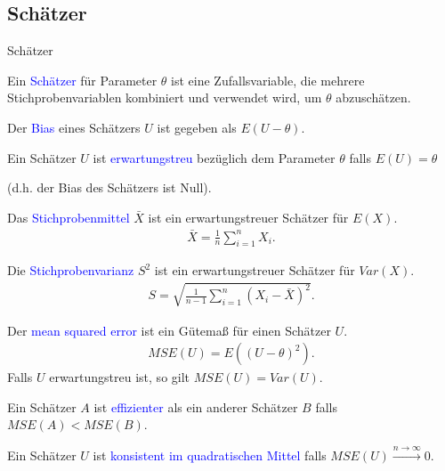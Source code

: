 \documentclass{beamer}
\def\padding{\vspace{0.5cm}}
\def\spadding{\vspace{0.25cm}}
\def\b{\textcolor{blue}}
\begin{document}
\subsection{Schätzer}
\begin{frame}{Schätzer}
    \begin{definition}
        Ein \b{Schätzer} für Parameter $\theta$ ist eine Zufallsvariable, die mehrere Stichprobenvariablen kombiniert und verwendet wird, um $\theta$ abzuschätzen.\pause\par\spadding
        Der \b{Bias} eines Schätzers $U$ ist gegeben als $E(U - \theta)$.\pause\par\spadding
        Ein Schätzer $U$ ist \b{erwartungstreu} bezüglich dem Parameter $\theta$ falls $E(U) = \theta$\par
        (d.h. der Bias des Schätzers ist Null).
    \end{definition}
\end{frame}

\begin{frame}
    \begin{definition}
        Das \b{Stichprobenmittel} $\bar{X}$ ist ein erwartungstreuer Schätzer für $E(X)$.
        \begin{align*}
            \bar{X} = \frac{1}{n} \sum_{i=1}^n X_i.
        \end{align*}
    \end{definition}\pause\par\padding
    \begin{definition}
        Die \b{Stichprobenvarianz} $S^2$ ist ein erwartungstreuer Schätzer für $Var(X)$.
        \begin{align*}
            S = \sqrt{\frac{1}{n - 1} \sum_{i=1}^n (X_i - \bar{X})^2}.
        \end{align*}
    \end{definition}
\end{frame}

\begin{frame}
    \begin{definition}
        Der \b{mean squared error} ist ein Gütemaß für einen Schätzer $U$.
        \begin{align*}
            MSE(U) = E((U - \theta)^2).
        \end{align*}\pause
        Falls $U$ erwartungstreu ist, so gilt $MSE(U) = Var(U)$.\pause\par\spadding
        Ein Schätzer $A$ ist \b{effizienter} als ein anderer Schätzer $B$ falls $MSE(A) < MSE(B)$.\par\pause\spadding
        Ein Schätzer $U$ ist \b{konsistent im quadratischen Mittel} falls $MSE(U) \xrightarrow{n \to \infty} 0.$
    \end{definition}
\end{frame}
\end{document}
